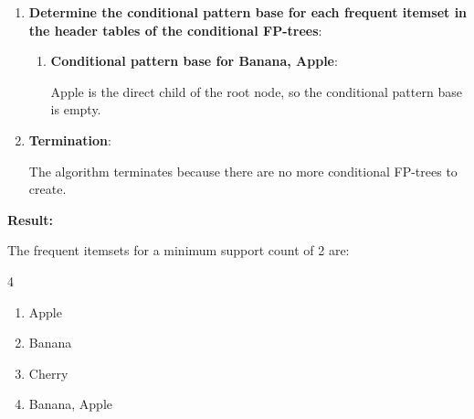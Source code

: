 \documentclass[
english,
smallborders
]{i6prcsht}
\begin{document}
\begin{solution}
\begin{enumerate}
		\item \textbf{Determine the conditional pattern base for each frequent itemset in the header tables of the conditional FP-trees}:
		      
		      
		      \begin{enumerate}	
			      \item \textbf{Conditional pattern base for \glqq Banana, Apple\grqq }:
			            
			            Apple is the direct child of the root node, so the conditional pattern base is empty.
		      \end{enumerate}
		      
		      
		\item \textbf{Termination}:
		      
		      The algorithm terminates because there are no more conditional FP-trees to create.
		      
	\end{enumerate}
	
	\textbf{Result:}
	
	\vspace*{-0.2cm}
	
	The frequent itemsets for a minimum support count of 2 are:
	
	\begin{multicols}{4}
		\begin{enumerate}	
			\item Apple
			\item Banana
			\item Cherry
			\item Banana, Apple
		\end{enumerate}
	\end{multicols}
	
\end{solution}
\end{document}
